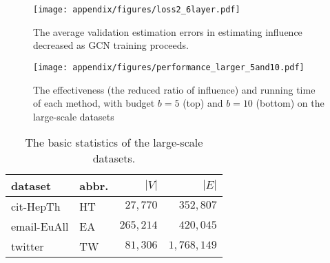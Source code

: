 \begin{figure}[h!]
   \centering
   \texttt{[image: appendix/figures/loss2\_6layer.pdf]}
   \caption{The average validation estimation errors in estimating influence decreased as GCN training proceeds.}
   \label{fig:val_error_6layer}
\end{figure}%


\begin{figure}[h!]
    \centering
    \texttt{[image: appendix/figures/performance\_larger\_5and10.pdf]}
    \caption{The effectiveness (the reduced ratio of influence) and running time of each method, with budget $b=5$ (top) and $b=10$ (bottom) on the large-scale datasets
    }
    \label{fig:app_perf_larger}
\end{figure}

\begin{table}[h!]
    \centering
    \begin{tabular}{l|l|r|r}
        \hline
        dataset &abbr. &\textbf{$|V|$}&\textbf{$|E|$} \bigstrut\\
        \hline
        cit-HepTh   & HT & $27,770$ & $352,807$\\
        email-EuAll & EA & $265,214$ & $420,045$\\ 
        twitter     & TW & $81,306$ & $1,768,149$\\
        \hline
    \end{tabular}
    \caption{The basic statistics of the large-scale datasets.}
    \label{tab:larger_data}
\end{table}